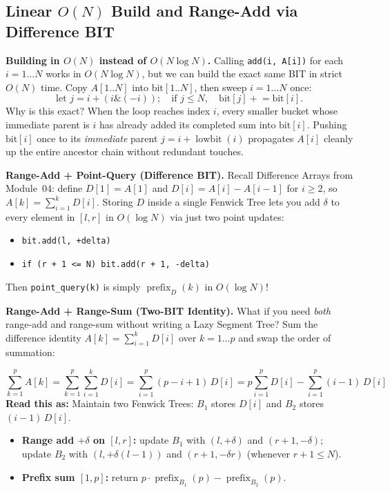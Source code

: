 \documentclass[11pt,a4paper]{article}
\theoremstyle{definition}
\begin{document}
\subsection{Linear \texorpdfstring{$O(N)$}{O(N)} Build and Range-Add via Difference BIT}

\textbf{Building in $O(N)$ instead of $O(N \log N)$.} Calling \texttt{add(i, A[i])} for each $i = 1 \dots N$ works in $O(N \log N)$, but we can build the exact same BIT in strict $O(N)$ time. Copy $A[1..N]$ into $\text{bit}[1..N]$, then sweep $i = 1 \dots N$ once:
$$\text{let } j = i + (i \mathbin{\&} (-i)); \quad \text{if } j \le N, \quad \text{bit}[j] \mathrel{+}= \text{bit}[i].$$
Why is this exact? When the loop reaches index $i$, every smaller bucket whose immediate parent is $i$ has already added its completed sum into $\text{bit}[i]$. Pushing $\text{bit}[i]$ once to its \emph{immediate} parent $j = i + \operatorname{lowbit}(i)$ propagates $A[i]$ cleanly up the entire ancestor chain without redundant touches.

\textbf{Range-Add + Point-Query (Difference BIT).} Recall Difference Arrays from Module~04: define $D[1] = A[1]$ and $D[i] = A[i] - A[i - 1]$ for $i \ge 2$, so $A[k] = \sum_{i=1}^{k} D[i]$. Storing $D$ inside a single Fenwick Tree lets you add $\delta$ to every element in $[l, r]$ in $O(\log N)$ via just two point updates:
\begin{itemize}[itemsep=2pt, topsep=2pt]
    \item \texttt{bit.add(l, +delta)}
    \item \texttt{if (r + 1 <= N) bit.add(r + 1, -delta)}
\end{itemize}
Then \texttt{point\_query(k)} is simply $\operatorname{prefix}_D(k)$ in $O(\log N)$!

\textbf{Range-Add + Range-Sum (Two-BIT Identity).} What if you need \emph{both} range-add and range-sum without writing a Lazy Segment Tree? Sum the difference identity $A[k] = \sum_{i=1}^{k} D[i]$ over $k = 1 \dots p$ and swap the order of summation:
\begin{formulabox}
$$\sum_{k=1}^{p} A[k] = \sum_{k=1}^{p} \sum_{i=1}^{k} D[i] = \sum_{i=1}^{p} (p - i + 1)\, D[i] = p \sum_{i=1}^{p} D[i] - \sum_{i=1}^{p} (i - 1)\, D[i]$$
\textbf{Read this as:} Maintain two Fenwick Trees: $B_1$ stores $D[i]$ and $B_2$ stores $(i - 1)\,D[i]$.
\begin{itemize}[itemsep=2pt, topsep=2pt]
    \item \textbf{Range add $+\delta$ on $[l, r]$:} update $B_1$ with $(l, +\delta)$ and $(r+1, -\delta)$; update $B_2$ with $(l, +\delta(l-1))$ and $(r+1, -\delta r)$ (whenever $r + 1 \le N$).
    \item \textbf{Prefix sum $[1, p]$:} return $p \cdot \operatorname{prefix}_{B_1}(p) - \operatorname{prefix}_{B_2}(p)$.
\end{itemize}
\end{formulabox}
\end{document}
